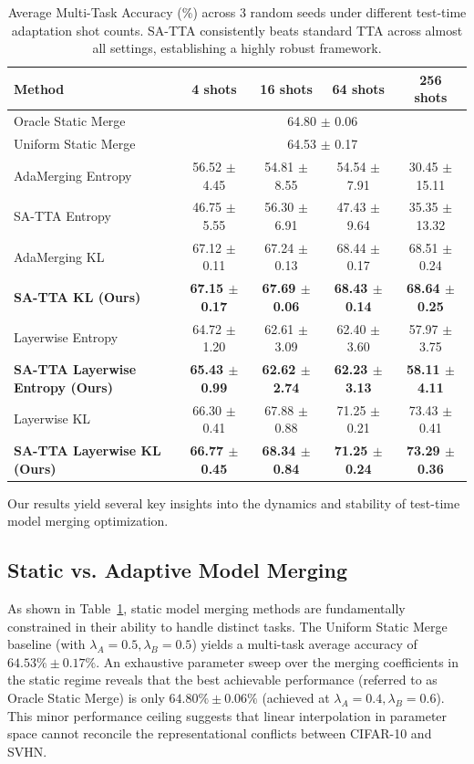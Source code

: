 \documentclass{article}
\theoremstyle{plain}
\theoremstyle{definition}
\theoremstyle{remark}
\begin{document}
\begin{table}[h]
\centering
\caption{Average Multi-Task Accuracy (\%) across 3 random seeds under different test-time adaptation shot counts. SA-TTA consistently beats standard TTA across almost all settings, establishing a highly robust framework.}
\label{tab:main_results}
\begin{tabular}{lcccc}
\toprule
Method & 4 shots & 16 shots & 64 shots & 256 shots \\
\midrule
Oracle Static Merge & \multicolumn{4}{c}{64.80 $\pm$ 0.06} \\
Uniform Static Merge & \multicolumn{4}{c}{64.53 $\pm$ 0.17} \\
\midrule
AdaMerging Entropy & 56.52 $\pm$ 4.45 & 54.81 $\pm$ 8.55 & 54.54 $\pm$ 7.91 & 30.45 $\pm$ 15.11 \\
SA-TTA Entropy & 46.75 $\pm$ 5.55 & 56.30 $\pm$ 6.91 & 47.43 $\pm$ 9.64 & 35.35 $\pm$ 13.32 \\
AdaMerging KL & 67.12 $\pm$ 0.11 & 67.24 $\pm$ 0.13 & 68.44 $\pm$ 0.17 & 68.51 $\pm$ 0.24 \\
\textbf{SA-TTA KL (Ours)} & \textbf{67.15 $\pm$ 0.17} & \textbf{67.69 $\pm$ 0.06} & \textbf{68.43 $\pm$ 0.14} & \textbf{68.64 $\pm$ 0.25} \\
Layerwise Entropy & 64.72 $\pm$ 1.20 & 62.61 $\pm$ 3.09 & 62.40 $\pm$ 3.60 & 57.97 $\pm$ 3.75 \\
\textbf{SA-TTA Layerwise Entropy (Ours)} & \textbf{65.43 $\pm$ 0.99} & \textbf{62.62 $\pm$ 2.74} & \textbf{62.23 $\pm$ 3.13} & \textbf{58.11 $\pm$ 4.11} \\
Layerwise KL & 66.30 $\pm$ 0.41 & 67.88 $\pm$ 0.88 & 71.25 $\pm$ 0.21 & 73.43 $\pm$ 0.41 \\
\textbf{SA-TTA Layerwise KL (Ours)} & \textbf{66.77 $\pm$ 0.45} & \textbf{68.34 $\pm$ 0.84} & \textbf{71.25 $\pm$ 0.24} & \textbf{73.29 $\pm$ 0.36} \\
\bottomrule
\end{tabular}
\end{table}

Our results yield several key insights into the dynamics and stability of test-time model merging optimization.

\subsection{Static vs. Adaptive Model Merging}
As shown in Table~\ref{tab:main_results}, static model merging methods are fundamentally constrained in their ability to handle distinct tasks. The Uniform Static Merge baseline (with $\lambda_A = 0.5, \lambda_B = 0.5$) yields a multi-task average accuracy of $64.53\% \pm 0.17\%$. An exhaustive parameter sweep over the merging coefficients in the static regime reveals that the best achievable performance (referred to as Oracle Static Merge) is only $64.80\% \pm 0.06\%$ (achieved at $\lambda_A = 0.4, \lambda_B = 0.6$). This minor performance ceiling suggests that linear interpolation in parameter space cannot reconcile the representational conflicts between CIFAR-10 and SVHN.
\end{document}
